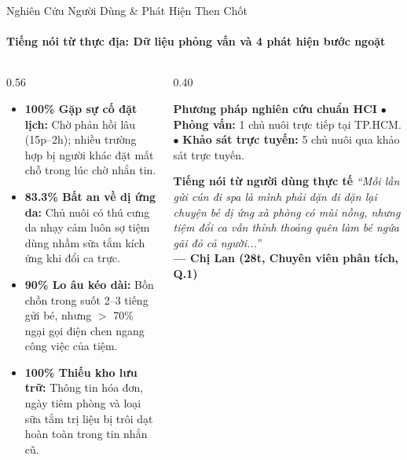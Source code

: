 \begin{frame}{Nghiên Cứu Người Dùng \& Phát Hiện Then Chốt}
  \framesubtitle{\color{PetcareSecondary}\textbf{Tiếng nói từ thực địa: Dữ liệu phỏng vấn và 4 phát hiện bước ngoặt}}

  \begin{columns}[T]
    \begin{column}{0.56\textwidth}
      \begin{itemize}
        \setlength\itemsep{1.2mm}
        \footnotesize
        \item \textbf{100\% Gặp sự cố đặt lịch:} Chờ phản hồi lâu (15p--2h); nhiều trường hợp bị người khác đặt mất chỗ trong lúc chờ nhắn tin.
        \item \textbf{83.3\% Bất an về dị ứng da:} Chủ nuôi có thú cưng da nhạy cảm luôn sợ tiệm dùng nhầm sữa tắm kích ứng khi đổi ca trực.
        \item \textbf{90\% Lo âu kéo dài:} Bồn chồn trong suốt 2--3 tiếng gửi bé, nhưng $>$ 70\% ngại gọi điện chen ngang công việc của tiệm.
        \item \textbf{100\% Thiếu kho lưu trữ:} Thông tin hóa đơn, ngày tiêm phòng và loại sữa tắm trị liệu bị trôi dạt hoàn toàn trong tin nhắn cũ.
      \end{itemize}
    \end{column}

    \begin{column}{0.40\textwidth}
      \begin{block}{\centering \scriptsize \textbf{Phương pháp nghiên cứu chuẩn HCI}}
        \scriptsize
        $\bullet$ \textbf{Phỏng vấn:} 1 chủ nuôi trực tiếp tại TP.HCM.\\
        $\bullet$ \textbf{Khảo sát trực tuyến:} 5 chủ nuôi qua khảo sát trực tuyến.
      \end{block}

      \vspace{-1mm}
      \begin{exampleblock}{\scriptsize \textbf{Tiếng nói từ người dùng thực tế}}
        \tiny \textit{``Mỗi lần gửi cún đi spa là mình phải dặn đi dặn lại chuyện bé dị ứng xà phòng có mùi nồng, nhưng tiệm đổi ca vẫn thỉnh thoảng quên làm bé ngứa gãi đỏ cả người...''}\\[1mm]
        \hfill \textbf{--- Chị Lan (28t, Chuyên viên phân tích, Q.1)}
      \end{exampleblock}
    \end{column}
  \end{columns}


\end{frame}
